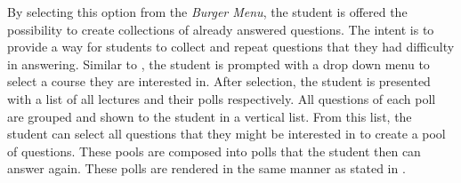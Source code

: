 By selecting this option from the \emph{Burger Menu}, the student is offered the possibility to create collections of already answered questions. The intent is to provide a way for students to collect and repeat questions that they had difficulty in answering.
Similar to \todosct, the student is prompted with a drop down menu to select a course they are interested in. After selection, the student is presented with a list of all lectures and their polls respectively. All questions of each poll are grouped and shown to the student in a vertical list. From this list, the student can select all questions that they might be interested in to create a pool of questions.
These pools are composed into polls that the student then can answer again. These polls are rendered in the same manner as stated in .


